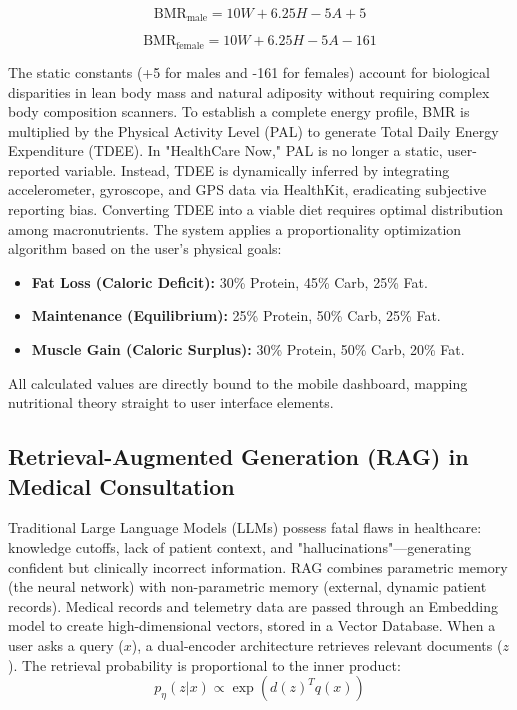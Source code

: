 \documentclass[journal, a4paper]{IEEEtran}
\begin{document}
\begin{equation}
\label{eq:bmr_male}
\text{BMR}_{\text{male}} = 10W + 6.25H - 5A + 5
\end{equation}

\begin{equation}
\label{eq:bmr_female}
\text{BMR}_{\text{female}} = 10W + 6.25H - 5A - 161
\end{equation}

The static constants (+5 for males and -161 for females) account for biological disparities in lean body mass and natural adiposity without requiring complex body composition scanners. To establish a complete energy profile, BMR is multiplied by the Physical Activity Level (PAL) to generate Total Daily Energy Expenditure (TDEE). In "HealthCare Now," PAL is no longer a static, user-reported variable. Instead, TDEE is dynamically inferred by integrating accelerometer, gyroscope, and GPS data via HealthKit, eradicating subjective reporting bias. Converting TDEE into a viable diet requires optimal distribution among macronutrients. The system applies a proportionality optimization algorithm based on the user's physical goals:
\begin{itemize}
    \item \textbf{Fat Loss (Caloric Deficit):} 30\% Protein, 45\% Carb, 25\% Fat.
    \item \textbf{Maintenance (Equilibrium):} 25\% Protein, 50\% Carb, 25\% Fat.
    \item \textbf{Muscle Gain (Caloric Surplus):} 30\% Protein, 50\% Carb, 20\% Fat.
\end{itemize}
All calculated values are directly bound to the mobile dashboard, mapping nutritional theory straight to user interface elements.

\subsection{Retrieval-Augmented Generation (RAG) in Medical Consultation}
Traditional Large Language Models (LLMs) possess fatal flaws in healthcare: knowledge cutoffs, lack of patient context, and "hallucinations"—generating confident but clinically incorrect information. RAG combines parametric memory (the neural network) with non-parametric memory (external, dynamic patient records). Medical records and telemetry data are passed through an Embedding model to create high-dimensional vectors, stored in a Vector Database. When a user asks a query ($x$), a dual-encoder architecture retrieves relevant documents ($z$). The retrieval probability is proportional to the inner product:
\begin{equation}
p_{\eta}(z|x) \propto \exp(d(z)^T q(x))
\end{equation}
\end{document}
